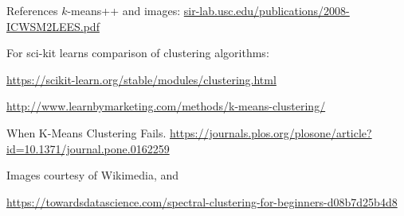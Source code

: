 \documentclass[10pt, table, dvipsnames,xcdraw,handout]{beamer}
\begin{document}
\begin{frame}[fragile,label=reference]{References}
$k$-means++ and images:
\url{sir-lab.usc.edu/publications/2008-ICWSM2LEES.pdf}

For sci-kit learns comparison of clustering algorithms: 

\url{https://scikit-learn.org/stable/modules/clustering.html}


\url{http://www.learnbymarketing.com/methods/k-means-clustering/}

When K-Means Clustering Fails. 
\url{https://journals.plos.org/plosone/article?id=10.1371/journal.pone.0162259}

Images courtesy of Wikimedia, and 

\url{https://towardsdatascience.com/spectral-clustering-for-beginners-d08b7d25b4d8}

\end{frame}
\end{document}
